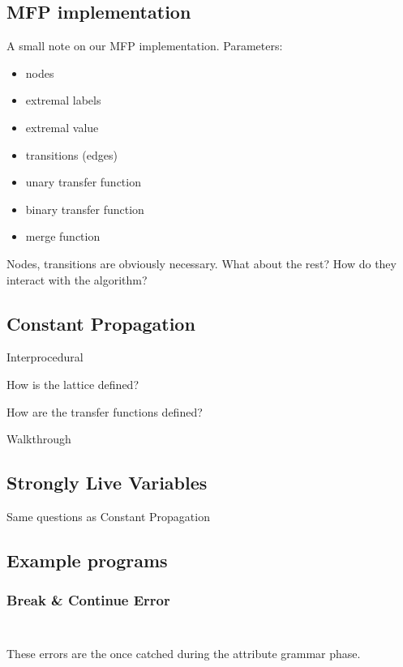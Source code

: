 \documentclass{article}
\begin{document}
\subsection*{MFP implementation}

A small note on our MFP implementation. Parameters:

\begin{itemize}
	\item nodes
	\item extremal labels
	\item extremal value
	\item transitions (edges)
	\item unary transfer function
	\item binary transfer function
	\item merge function
\end{itemize}

Nodes, transitions are obviously necessary. What about the rest? How do they interact with the algorithm?

\subsection*{Constant Propagation}

Interprocedural

How is the lattice defined?

How are the transfer functions defined?

Walkthrough

\subsection*{Strongly Live Variables}

Same questions as Constant Propagation

\subsection*{Example programs}

\subsubsection*{Break \& Continue Error}

\inputminted{c}{../examples/break_error.c}

\inputminted{c}{../examples/continue_error.c}

These errors are the once catched during the attribute grammar phase.
\end{document}
